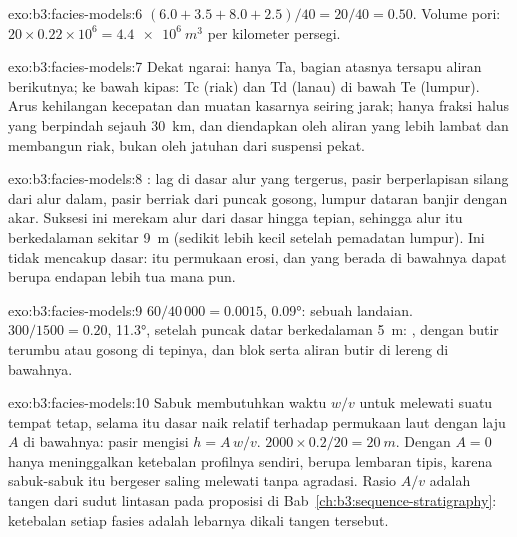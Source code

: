 \begin{solution}{exo:b3:facies-models:6}
$(6.0 + 3.5 + 8.0 + 2.5)/40 = 20/40 = 0.50$. Volume pori: $20\times0.22
\times10^6 = \qty{4.4e6}{m^3}$ per kilometer persegi.
\end{solution}

\begin{solution}{exo:b3:facies-models:7}
Dekat ngarai: hanya Ta, bagian atasnya tersapu aliran berikutnya; ke bawah
kipas: Tc (riak) dan Td (lanau) di bawah Te (lumpur). Arus kehilangan kecepatan
dan muatan kasarnya seiring jarak; hanya fraksi halus yang berpindah
sejauh \qty{30}{km}, dan diendapkan oleh aliran yang lebih lambat dan membangun riak, bukan
oleh jatuhan dari suspensi pekat.
\end{solution}

\begin{solution}{exo:b3:facies-models:8}
 : lag di dasar alur yang tergerus,
pasir berperlapisan silang dari alur dalam, pasir berriak dari puncak gosong,
lumpur dataran banjir dengan akar. Suksesi ini merekam alur dari dasar
hingga tepian, sehingga alur itu berkedalaman sekitar \qty{9}{m} (sedikit lebih kecil setelah
pemadatan lumpur). Ini tidak mencakup dasar: itu permukaan erosi, dan
yang berada di bawahnya dapat berupa endapan lebih tua mana pun.
\end{solution}

\begin{solution}{exo:b3:facies-models:9}
$60/40\,000 = 0.0015$, \ang{0.09}: sebuah landaian. $300/1500 = 0.20$, \ang{11.3},
setelah puncak datar berkedalaman \qty{5}{m}: , dengan butir terumbu atau gosong
di tepinya, dan blok serta aliran butir di lereng di bawahnya.
\end{solution}

\begin{solution}{exo:b3:facies-models:10}
Sabuk membutuhkan waktu $w/v$ untuk melewati suatu tempat tetap, selama itu dasar
naik relatif terhadap permukaan laut dengan laju $A$ di bawahnya: pasir mengisi $h = A\,w/v$.
$2000\times0.2/20 = \qty{20}{m}$. Dengan $A = 0$  hanya meninggalkan
ketebalan profilnya sendiri, berupa lembaran tipis, karena sabuk-sabuk itu bergeser saling melewati
tanpa agradasi. Rasio $A/v$ adalah tangen dari sudut lintasan
pada proposisi di Bab~\ref{ch:b3:sequence-stratigraphy}: ketebalan setiap fasies
adalah lebarnya dikali tangen tersebut.
\end{solution}

